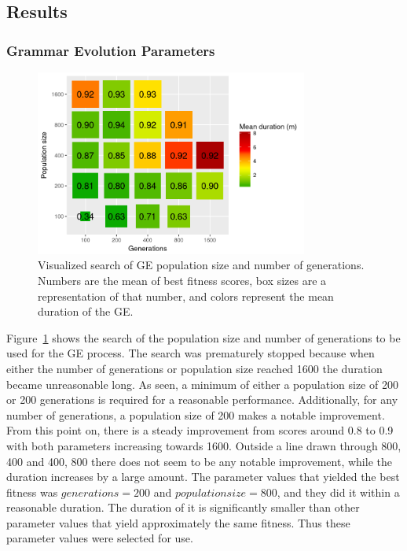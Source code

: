 
\subsection{Results}
\subsubsection{Grammar Evolution Parameters}
\begin{figure}
    \centering
    \includegraphics[width=0.8\textwidth]{figures/ge-size-sampling}
    \caption[Visualized search of GE population size and number of generations]{Visualized search of \gls{GE} population size and number of generations. Numbers are the mean of best fitness scores, box sizes are a representation of that number, and colors represent the mean duration of the \gls{GE}.}
    \label{fig:size-sampling}
\end{figure}

Figure~\ref{fig:size-sampling} shows the search of the population size and number of generations to be used for the \gls{GE} process.
The search was prematurely stopped because when either the number of generations or population size reached 1600 the duration became unreasonable long.
As seen, a minimum of either a population size of 200 or 200 generations is required for a reasonable performance.
Additionally, for any number of generations, a population size of 200 makes a notable improvement.
From this point on, there is a steady improvement from scores around 0.8 to 0.9 with both parameters increasing towards 1600.
Outside a line drawn through 800, 400 and 400, 800 there does not seem to be any notable improvement, while the duration increases by a large amount.
The parameter values that yielded the best fitness was $generations = 200$ and $population size = 800$, and they did it within a reasonable duration.
The duration of it is significantly smaller than other parameter values that yield approximately the same fitness.
Thus these parameter values were selected for use.

